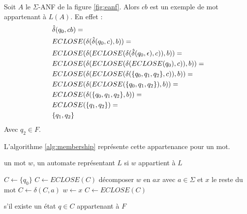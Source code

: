 \begin{example}
  Soit $A$ le $\Sigma$-ANF de la figure \ref{fig:eanf}. Alors $cb$ est un exemple de mot appartenant à $L(A)$. En effet :
  \begin{align*}
    &\hat{\delta}(q_0,cb)=\\
    &ECLOSE(\delta(\hat{\delta}(q_0, c),b))=\\
    &ECLOSE(\delta(ECLOSE(\delta(\hat{\delta}(q_0,\epsilon),c)),b))=\\
    &ECLOSE(\delta(ECLOSE(\delta(ECLOSE(q_0),c)),b))=\\
    &ECLOSE(\delta(ECLOSE(\delta(\{q_0,q_1,q_2\},c)),b))=\\
    &ECLOSE(\delta(ECLOSE(\{q_0,q_1,q_2\}),b))=\\
    &ECLOSE(\delta(\{q_0,q_1,q_2\},b))=\\
    &ECLOSE(\{q_1,q_2\})=\\
    &\{q_1,q_2\}
  \end{align*}
  Avec $q_2\in F$.
\end{example}



L'algorithme \ref{alg:membership} représente cette appartenance pour un mot.


\begin{algo}\label{alg:membership}
 \begin{algorithmic}[1]
   \REQUIRE un mot $w$, un automate \automaton représentant $L$
   \ENSURE si $w$ appartient à $L$

   \STATE $C \leftarrow \{q_0\}$ 
   \STATE $C \leftarrow ECLOSE(C)$
   \ENDIF
   \STATE décomposer $w$ en $ax$ avec $a\in\Sigma$ et $x$ le reste du mot
   \STATE $C \leftarrow \delta(C,a)$ 
   \STATE {}
   \STATE $w \leftarrow x$
   \STATE $C \leftarrow ECLOSE(C)$
   \ENDIF
   \ENDWHILE

   \RETURN s'il existe un état $q \in C$ appartenant à $F$
 \end{algorithmic}
\end{algo}

